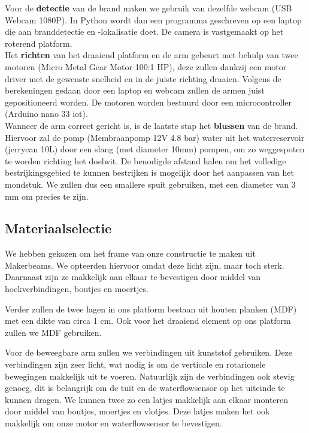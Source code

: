 \documentclass[kulak]{kulakarticle} %
\begin{document}
		Voor de \textbf{detectie} van de brand maken we gebruik van dezelfde webcam (USB Webcam 1080P). In Python wordt dan een programma geschreven op een laptop die aan branddetectie en -lokalisatie doet. De camera is vastgemaakt op het roterend platform. \\
		
		Het \textbf{richten} van het draaiend platform en de arm gebeurt met behulp van twee motoren (Micro Metal Gear Motor 100:1 HP), deze zullen dankzij een motor driver met de gewenste snelheid en in de juiste richting draaien. Volgens de berekeningen gedaan door een laptop en webcam zullen de armen juist gepositioneerd worden. De motoren worden bestuurd door een microcontroller (Arduino nano 33 iot). \\
		
		Wanneer de arm correct gericht is, is de laatste stap het \textbf{blussen} van de brand. Hiervoor zal de pomp (Membraanpomp 12V 4.8 bar) water uit het waterreservoir (jerrycan 10L) door een slang (met diameter 10mm) pompen, om zo weggespoten te worden richting het doelwit. De benodigde afstand halen om het volledige bestrijkingsgebied te kunnen bestrijken is mogelijk door het aanpassen van het mondstuk. We zullen dus een smallere spuit gebruiken, met een diameter van 3 mm om precies te zijn.\\
		
		
	\subsection{Materiaalselectie}
	
		We hebben gekozen om het frame van onze constructie te maken uit Makerbeams. We opteerden hiervoor omdat deze licht zijn, maar toch sterk. Daarnaast zijn ze makkelijk aan elkaar te bevestigen door middel van hoekverbindingen, boutjes en moertjes.
		
		Verder zullen de twee lagen in ons platform bestaan uit houten planken (MDF) met een dikte van circa 1 cm. Ook voor het draaiend element op ons platform zullen we MDF gebruiken.
		
		Voor de beweegbare arm zullen we verbindingen uit kunststof gebruiken. Deze verbindingen zijn zeer licht, wat nodig is om de verticale en rotarionele bewegingen makkelijk uit te voeren. Natuurlijk zijn de verbindingen ook stevig genoeg, dit is belangrijk om de tuit en de waterflowsensor op het uiteinde te kunnen dragen. We kunnen twee zo een latjes makkelijk aan elkaar monteren door middel van boutjes, moertjes en vlotjes. Deze latjes maken het ook makkelijk om onze motor en waterflowsensor te bevestigen.
	
\end{document}
